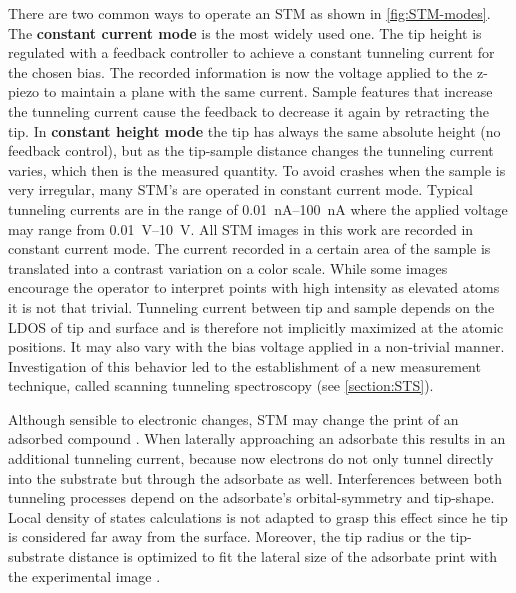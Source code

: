 There are two common ways to operate an STM as shown in \autoref{fig:STM-modes}.
The \textbf{constant current mode} is the most widely used one. The tip height is regulated with a feedback controller to achieve a constant tunneling current for the chosen bias. The recorded information is now the voltage applied to the z-piezo to maintain a plane with the same current. Sample features that increase the tunneling current cause the feedback to decrease it again by retracting the tip.
In \textbf{constant height mode} the tip has always the same absolute height (no feedback control), but as the tip-sample distance changes the tunneling current varies, which then is the measured quantity.
To avoid crashes when the sample is very irregular, many STM's are operated in constant current mode. Typical tunneling currents are in the range of \SIrange{0.01}{100}{\nA} where the applied voltage may range from \SIrange{0.01}{10}{\volt}. All STM images in this work are recorded in constant current mode.
The current recorded in a certain area of the sample is translated into a contrast variation on a color scale. While some images encourage the operator to interpret points with high intensity as elevated atoms it is not that trivial. Tunneling current between tip and sample depends on the LDOS of tip and surface and is therefore not implicitly maximized at the atomic positions. It may also vary with the bias voltage applied in a non-trivial manner. Investigation of this behavior led to the establishment of a new measurement technique, called scanning tunneling spectroscopy (see  \autoref{section:STS}). 

Although sensible to electronic changes, STM may change the print of an adsorbed compound \cite{sautet_interpretation_1992}. When laterally approaching an adsorbate this results in an additional tunneling current, because now electrons do not only tunnel directly into the substrate but through the adsorbate as well. Interferences between both tunneling processes depend on the adsorbate's orbital-symmetry and tip-shape. Local density of states calculations \cite{tersoff_theory_1985, lang_theory_1986, eigler_imaging_1991} is not adapted to grasp this effect since he tip is considered far away from the surface. Moreover, the tip radius or the tip-substrate distance is optimized to fit the lateral size of the adsorbate print with the experimental image \cite{tersoff_theory_1985, eigler_imaging_1991 }.


